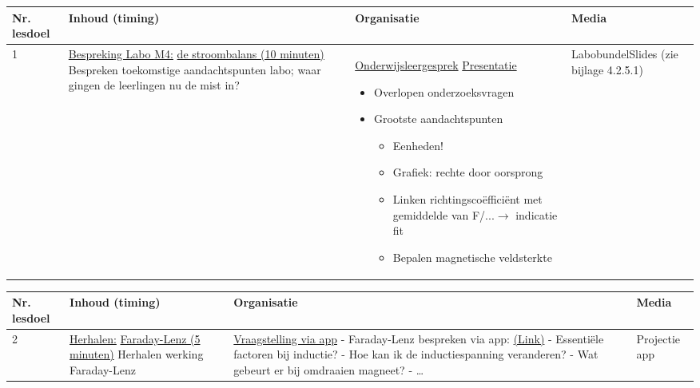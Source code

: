 \begin{landscape}
\newpage


\begin{tabularx}{1.56\textwidth}{|p{1.5cm}|p{8cm}|X|p{4cm}|}
	\hline
	\textbf{Nr. lesdoel } & \textbf{Inhoud (timing)}  & \textbf{Organisatie } & \textbf{Media } \\ \hline
	1	&\underline{Bespreking Labo M4:} \underline{de stroombalans (10 minuten)}\newline
	Bespreken toekomstige aandachtspunten labo; waar gingen de leerlingen nu de mist in?
	&  \underline{Onderwijsleergesprek}\newline 
	\underline{Presentatie}
	\begin{itemize}
		\item Overlopen onderzoeksvragen
		\item Grootste aandachtspunten
		\begin{itemize}
			\item Eenheden!
			\item Grafiek: rechte door oorsprong
			\item Linken richtingscoëfficiënt met gemiddelde van F/...$\rightarrow$ indicatie fit
			\item Bepalen magnetische veldsterkte
		\end{itemize}
	\end{itemize}
	&  Labobundel\newline\newline Slides (zie bijlage 4.2.5.1)
	\\ \hline
\end{tabularx}\vspace{5mm}

\begin{tabularx}{1.56\textwidth}{|p{1.5cm}|p{6.5cm}|X|p{4cm}|}
	\hline
	\textbf{Nr. lesdoel } & \textbf{Inhoud (timing)}  & \textbf{Organisatie } & \textbf{Media } \\ \hline
	2\newline\newline3	&\underline{Herhalen:} \underline{Faraday-Lenz (5 minuten)}\newline
	Herhalen werking Faraday-Lenz
	&  \underline{Vraagstelling via app} \newline 
	- Faraday-Lenz bespreken via app: \href{https://phet.colorado.edu/sims/html/faradays-law/latest/faradays-law_en.html
	}{(Link)}\newline
	- Essentiële factoren bij inductie?\newline
	- Hoe kan ik de inductiespanning veranderen?\newline
	- Wat gebeurt er bij omdraaien magneet?\newline
	- \ldots
	&   Projectie app
	\\ \hline
\end{tabularx}\vspace{5mm}
	

\end{landscape}
